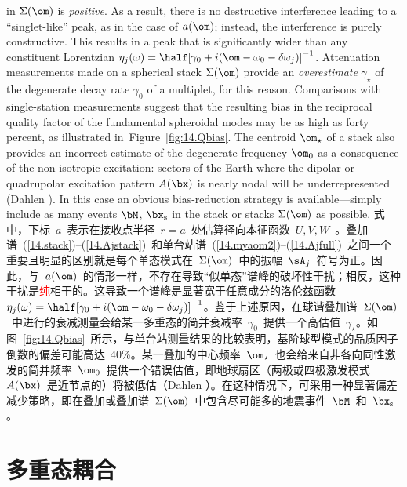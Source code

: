 in $\Sigma(\om)$ is {\em positive\/}.  As a result,
there is no destructive interference leading to a
``singlet-like'' peak, as in the case of $a(\om)$;
instead, the interference is purely constructive.
This results in a peak that is significantly wider
than any constituent Lorentzian $\eta_j(\omega)=
\half [\gamma_0+i(\om-\omega_0-\delta\omega_j)]^{-1}$.
Attenuation measurements made on a spherical stack
$\Sigma(\om)$ provide an {\em overestimate\/} $\gamma_{\star}$
of the degenerate decay rate $\gamma_0$ of a multiplet,
for this reason.  Comparisons with single-station
measurements suggest that the resulting bias in
the reciprocal quality factor of the fundamental
spheroidal modes may be as high as forty percent, as
illustrated in~Figure~\ref{fig:14.Qbias}.
The centroid $\om_{\star}$ of a stack also
provides an incorrect estimate of the degenerate
frequency $\om_0$ as a consequence of the non-isotropic
excitation: sectors of the Earth where the dipolar or
quadrupolar excitation pattern $A(\bx)$ is nearly nodal
will be underrepresented (Dahlen \citeyear{dahlen79}).
In this case an obvious bias-reduction strategy
is available---simply include as many events
$\bM$, $\bx_{\rm s}$ in the stack or stacks
$\Sigma(\om)$ as possible.
%
%
%
\fi
式中，下标~$a$~表示在接收点半径~$r=a$~处估算径向本征函数~$U,V,W$~。叠加谱~(\ref{14.stack})--(\ref{14.Ajstack})~和单台站谱~(\ref{14.myaom2})--(\ref{14.Ajfull})~之间一个重要且明显的区别就是每个单态模式在~$\Sigma(\om)$~中的振幅~$\sA_j$~符号为正。因此，与~$a(\om)$~的情形一样，不存在导致“似单态”谱峰的破坏性干扰；相反，这种干扰是\textcolor{red}{纯}相干的。这导致一个谱峰是显著宽于任意成分的洛伦兹函数~$\eta_j(\omega)=
\half [\gamma_0+i(\om-\omega_0-\delta\omega_j)]^{-1}$。鉴于上述原因，在球谐叠加谱~$\Sigma(\om)$~中进行的衰减测量会给某一多重态的简并衰减率~$\gamma_0$~提供一个高估值~$\gamma_{\star}$。如图~\ref{fig:14.Qbias}~所示，与单台站测量结果的比较表明，基阶球型模式的品质因子倒数的偏差可能高达~40\%。某一叠加的中心频率~$\om_{\star}$~也会给来自非各向同性激发的简并频率~$\om_0$~提供一个错误估值，即地球扇区（两极或四极激发模式~$A(\bx)$~是近节点的）将被低估（Dahlen \citeyear{dahlen79}）。在这种情况下，可采用一种显著偏差减少策略，即在叠加或叠加谱~$\Sigma(\om)$~中包含尽可能多的地震事件~$\bM$~和~$\bx_{\rm s}$。

\section{多重态耦合}
%
%
%

